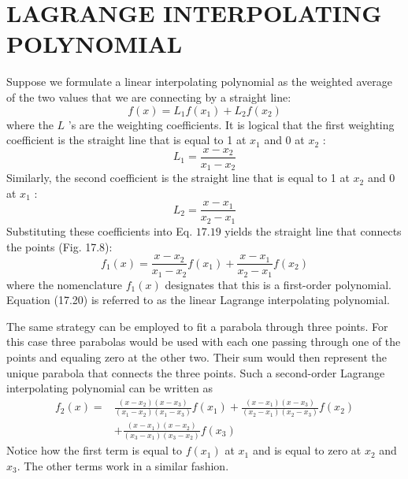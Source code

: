 \documentclass[../main.tex]{subfiles}
\begin{document}
    \section{LAGRANGE INTERPOLATING POLYNOMIAL}
    Suppose we formulate a linear interpolating polynomial as the weighted average of the two
    values that we are connecting by a straight line:
    \begin{equation}
        \tag{17.19}
    f(x)=L_{1} f\left(x_{1}\right)+L_{2} f\left(x_{2}\right)
\end{equation}
    where the $L$ 's are the weighting coefficients. It is logical that the first weighting coefficient is the straight line that is equal to 1 at $x_{1}$ and 0 at $x_{2}$ :
    $$
    L_{1}=\frac{x-x_{2}}{x_{1}-x_{2}}
    $$
    Similarly, the second coefficient is the straight line that is equal to 1 at $x_{2}$ and 0 at $x_{1}$ :
    $$
    L_{2}=\frac{x-x_{1}}{x_{2}-x_{1}}
    $$
    Substituting these coefficients into Eq. $17.19$ yields the straight line that connects the points (Fig. 17.8):
    \begin{equation}
        \tag{17.20}
    f_{1}(x)=\frac{x-x_{2}}{x_{1}-x_{2}} f\left(x_{1}\right)+\frac{x-x_{1}}{x_{2}-x_{1}} f\left(x_{2}\right)
\end{equation}
    where the nomenclature $f_{1}(x)$ designates that this is a first-order polynomial. Equation (17.20) is referred to as the linear Lagrange interpolating polynomial.
    
    The same strategy can be employed to fit a parabola through three points. For this case three parabolas would be used with each one passing through one of the points and equaling zero at the other two. Their sum would then represent the unique parabola that connects the three points. Such a second-order Lagrange interpolating polynomial can be written as
    \begin{equation}
        \tag{17.21}
    \begin{aligned}
    f_{2}(x)=& \frac{\left(x-x_{2}\right)\left(x-x_{3}\right)}{\left(x_{1}-x_{2}\right)\left(x_{1}-x_{3}\right)} f\left(x_{1}\right)+\frac{\left(x-x_{1}\right)\left(x-x_{3}\right)}{\left(x_{2}-x_{1}\right)\left(x_{2}-x_{3}\right)} f\left(x_{2}\right) \\
    &+\frac{\left(x-x_{1}\right)\left(x-x_{2}\right)}{\left(x_{3}-x_{1}\right)\left(x_{3}-x_{2}\right)} f\left(x_{3}\right)
    \end{aligned}
\end{equation}
    Notice how the first term is equal to $f\left(x_{1}\right)$ at $x_{1}$ and is equal to zero at $x_{2}$ and $x_{3}$. The other terms work in a similar fashion.
    
\end{document}
